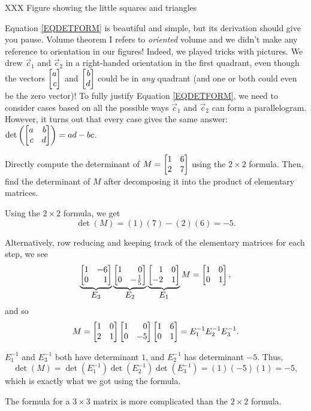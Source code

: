 XXX Figure showing the little squares and triangles

Equation \eqref{EQDETFORM} is beautiful and simple, but its derivation should give you pause. Volume theorem I refers
to \emph{oriented} volume and we didn't make any reference to orientation in our figures! Indeed, we played tricks
with pictures. We drew $\vec c_1$ and $\vec c_2$ in a right-handed orientation in the first quadrant, even though the
vectors $\mat{a\\c}$ and $\mat{b\\d}$ could be in \emph{any} quadrant (and one or both could even be the zero vector)!
To fully justify Equation \eqref{EQDETFORM}, we need to consider cases based on all the possible ways $\vec c_1$ and $\vec c_2$
can form a parallelogram. However, it turns out that every case gives the same answer: $\det\left(\mat{a&b\\c&d}\right)=ad-bc$.

\begin{example}
	Directly compute the determinant of $M=\mat{1 & 6 \\ 2 & 7}$ using the $2\times 2$ formula.
	Then, find the determinant of $M$ after decomposing it into the product of elementary matrices.

	Using the $2\times 2$ formula, we get
	\[
		\det(M)=(1)(7)-(2)(6)=-5.
	\]

	Alternatively, row reducing and keeping track of the elementary matrices for each step, we see
	\[
		\underbrace{\mat{1 & -6 \\ 0 & 1}}_{\textstyle E_3}
		\underbrace{\mat{1 & 0 \\ 0 & -\frac{1}{5}}}_{\textstyle E_2}
		\underbrace{\mat{1 & 0 \\ -2 & 1}}_{\textstyle E_1} M = \mat{1&0\\0&1},
	\]
	and so
	\[
		M = \mat{1 & 0 \\ 2 & 1}
		    \mat{1 & 0 \\ 0 & -5}
		    \mat{1 & 6 \\ 0 & 1} = E_1^{-1} E_2^{-1} E_3^{-1}.
	\]

	$E_1^{-1}$ and $E_3^{-1}$ both have determinant $1$, and $E_2^{-1}$ has determinant $-5$. Thus,
	\[
		\det(M)=\det(E_1^{-1})\det(E_2^{-1})\det(E_3^{-1})=(1)(-5)(1)=-5,
	\]
	which is exactly what we got using the formula.
\end{example}


The formula for a $3\times 3$ matrix is more complicated than the $2\times 2$ formula.

